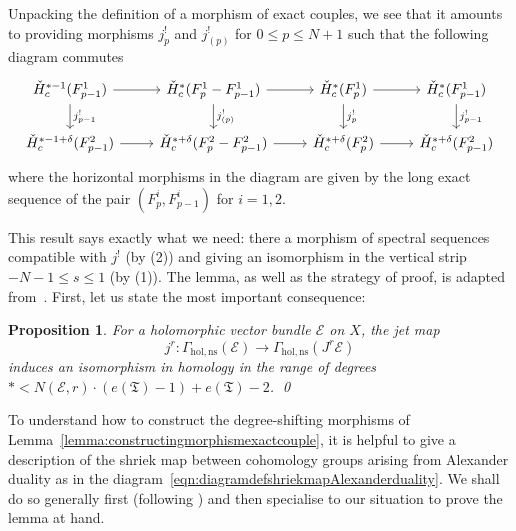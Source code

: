 \documentclass[a4paper]{amsart}
\newcommand{\cE}{\mathcal E}
\newcommand{\fT}{\mathfrak T}
\newcommand{\lra}{\longrightarrow}
\theoremstyle{plain}
\newtheorem{proposition}[theorem]{Proposition}
\theoremstyle{definition}
\newcommand{\CCH}{\check{H}_{c}}
\begin{document}
Unpacking the definition of a morphism of exact couples, we see that it amounts to providing morphisms $j^!_p$ and $j^!_{(p)}$ for $0 \leq p \leq N+1$ such that the following diagram commutes
\begin{equation*}
\begin{tikzcd}
\CCH^{*-1}(F_{p-1}^1) \arrow[r] \arrow[d, "j^!_{p-1}"] & \CCH^*(F_p^1 - F_{p-1}^1) \arrow[r] \arrow[d, "j^!_{(p)}"] & \CCH^*(F_p^1) \arrow[r] \arrow[d, "j^!_p"] & \CCH^*(F_{p-1}^1) \arrow[d, "j^!_{p-1}"] \\
\CCH^{*-1+\delta}(F_{p-1}^2) \arrow[r]                 & \CCH^{*+\delta}(F_p^2 - F_{p-1}^2) \arrow[r]               & \CCH^{*+\delta}(F_p^2) \arrow[r]           & \CCH^{*+\delta}(F_{p-1}^2)              
\end{tikzcd}
\end{equation*}
where the horizontal morphisms in the diagram are given by the long exact sequence of the pair $(F_p^i,F_{p-1}^i)$ for $i=1,2$. 

\bigskip

This result says exactly what we need: there a morphism of spectral sequences compatible with $j^!$ (by (2)) and giving an isomorphism in the vertical strip $-N-1 \leq s \leq 1$ (by (1)). The lemma, as well as the strategy of proof, is adapted from~\cite[Proposition 4.7]{vokrinek_generalization_2007}. First, let us state the most important consequence:
\begin{proposition}\label{prop:jetmapisohomology}
For a holomorphic vector bundle $\cE$ on $X$, the jet map 
\[
    j^r \colon \Gamma_{\mathrm{hol,ns}}(\cE) \lra \Gamma_{\mathrm{hol,ns}}(J^r\cE)
\]
induces an isomorphism in homology in the range of degrees $* < N(\cE,r)\cdot (e(\fT)-1) + e(\fT) - 2$. \qed
\end{proposition}

\bigskip


To understand how to construct the degree-shifting morphisms of Lemma~\ref{lemma:constructingmorphismexactcouple}, it is helpful to give a description of the shriek map between cohomology groups arising from Alexander duality as in the diagram~\eqref{eqn:diagramdefshriekmapAlexanderduality}. We shall do so generally first (following \cite[Appendix D]{vokrinek_generalization_2007}) and then specialise to our situation to prove the lemma at hand.
\end{document}
